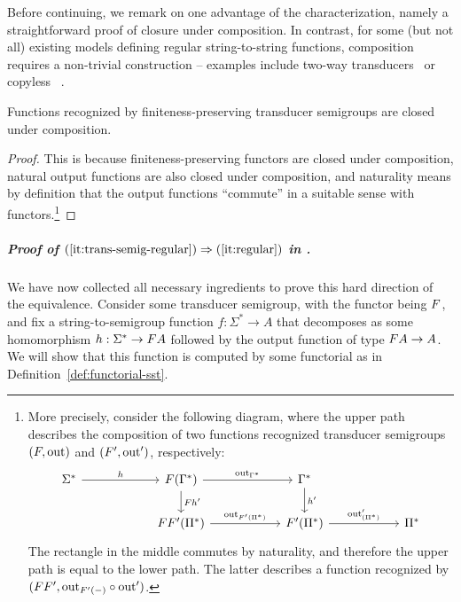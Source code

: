 Before continuing, we remark on one advantage of the characterization, namely a
straightforward proof of closure under composition. In contrast, for some (but
not all) existing models defining regular string-to-string functions,
composition requires a non-trivial construction -- examples include two-way
transducers~\cite[Theorem 2]{ChytilJ77} or copyless \sst~\cite[Theorem
1]{composingSST}.
\begin{proposition}\label{prop:composition}
  Functions recognized by finiteness-preserving transducer semigroups are closed
  under composition.
\end{proposition}
\begin{proof}
  This is because finiteness-preserving functors are closed under composition,
  natural output functions are also closed under composition, and naturality
  means by definition that the output functions \enquote{commute} in a suitable
  sense with functors.\footnote{More precisely, consider the following diagram,
    where the upper path describes the composition of two functions recognized
    transducer semigroups $(\functor,\outfun)$ and $(\functor',\outfun')$,
    respectively:
    \[
      \begin{tikzcd}[ampersand replacement=\&, column sep=2cm]
        \Sigma^* 
        \ar[r,"h"]
        \& 
        \functor(\Gamma^*)
        \ar[r,"\outfun_{\Gamma^*}"]
        \ar[d,"\functor h'"]
        \&
        \Gamma^* \ar[d,"h'"]\\
        \&
        \functor\functor'(\Pi^*) \ar[r,"\outfun_{\functor'(\Pi^*)}"]
        \& 
        \functor'(\Pi^*)
        \ar[r,"\outfun'_{(\Pi^*)}"]
        \&
        \Pi^*
      \end{tikzcd}
    \]
    The rectangle in the middle commutes by naturality, and therefore the upper path is equal to the lower path. The latter describes a function recognized by $(\functor\functor', \outfun_{\functor'(-)} \circ \outfun')$.}
\end{proof}



 




\subparagraph*{Proof of $(\ref{it:trans-semig-regular}) \Rightarrow (\ref{it:regular})$ in .}
We have now collected all necessary ingredients to prove this hard direction of the equivalence. Consider some transducer semigroup, with the functor being $\functor$, and fix a string-to-semigroup function $f : \Sigma^* \to A$ that decomposes as some homomorphism $h : \Sigma^* \to \functor A$ followed by the output function of type $\functor A \to A$. 
We will show that this function  is computed by some functorial \sst as in Definition~\ref{def:functorial-sst}.

